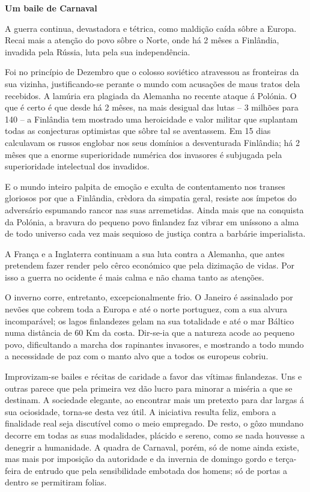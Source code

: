 \documentclass[9pt]{article}
\begin{document}
\begin{center}\bf\large Um baile de Carnaval\end{center}

A guerra continua, devastadora e tétrica, como maldi\-ção caída sôbre
a Europa. Recai mais a aten\-ção do povo sôbre o Norte, onde há 2 mêses a
Finlândia, invadida pela Rússia, luta pela sua independên\-cia.

Foi no princípio de Dezembro que o colosso soviético atravessou
as fronteiras da sua vizinha, justifi\-cando-se perante o mundo com acusa\-ções de maus tratos dela recebidos. A lamúria era plagiada da Alemanha
no recente ataque á Polónia. O que é certo é que desde há 2 mêses, na mais
desigual das lutas -- 3 mi\-lhões para 140 -- a Finlândia tem mostrado uma
heroicidade e valor militar que suplantam todas as conjecturas optimistas que sôbre tal se aventassem. Em 15 dias calculavam os russos englobar nos seus domínios a desventurada Finlândia; há 2 mêses que a enorme
superioridade numérica dos invasores é subjugada pela superioridade intelectual dos invadidos.

E o mundo inteiro palpita de emo\-ção e exulta de contentamento nos
transes gloriosos por que a Finlândia, crèdora da simpatia geral, resiste aos ímpetos do adversário espumando rancor nas suas arremetidas. Ainda mais que na conquista da Polónia, a bravura do pequeno povo finlandez
faz vibrar em uníssono a alma de todo universo cada vez mais sequioso
de justiça contra a barbárie imperialista.

A Fran\-ça e a Inglaterra continuam a sua luta contra a Alemanha, que
antes pretendem fazer render pelo cêrco económico que pela dizima\-ção de
vidas. Por isso a guerra no ocidente é mais calma e não chama tanto as
aten\-ções.

O inverno corre, entretanto, excepcionalmente frio. O Janeiro é assinalado por nevões que cobrem toda a Europa e até o norte portuguez, com
a sua alvura incomparável; os lagos finlandezes gelam na sua totalidade
e até o mar Báltico numa distância de 60 Km da costa. Dir-se-ia que a
natureza acode ao pequeno povo, dificultando a marcha dos rapinantes invasores, e mostrando a todo mundo a necessidade de paz com o manto alvo
que a todos os europeus cobriu.

Improvizam-se bailes e récitas de caridade a favor das vítimas finlandezas. Uns e outras parece que pela primeira vez dão lucro para minorar a miséria a que se destinam. A sociedade elegante, ao encontrar
mais um pretexto para dar largas á sua ociosidade, torna-se desta vez
útil. A iniciativa resulta feliz, embora a finalidade real seja discutível
como o meio empregado. De resto, o gôzo mundano decorre em todas as suas
modalidades, plácido e sereno, como se nada houvesse a denegrir a humanidade. A quadra de Carnaval, porém, só de nome ainda existe, mas mais por
imposi\-ção da autoridade e da invernia de domingo gordo e terça-feira de
entrudo que pela sensibilidade embotada dos homens; só de portas a dentro
se permitiram folias.
\end{document}
